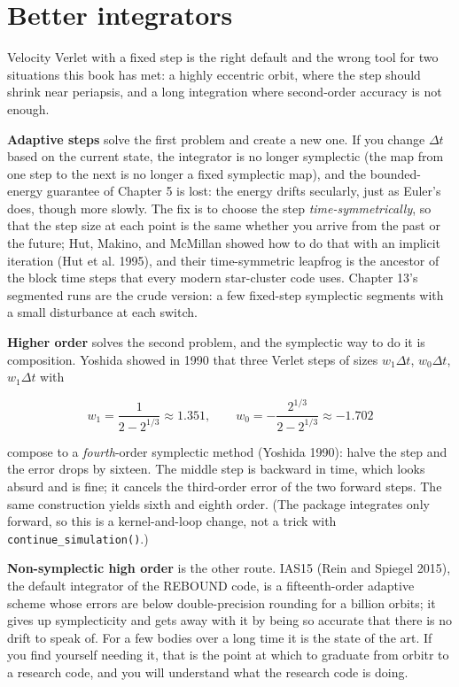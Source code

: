 \documentclass[
  10.5pt,
  letterpaper,
]{scrbook}
\theoremstyle{plain}
\theoremstyle{remark}
\begin{document}
\section{Better integrators}\label{better-integrators}

Velocity Verlet with a fixed step is the right default and the wrong
tool for two situations this book has met: a highly eccentric orbit,
where the step should shrink near periapsis, and a long integration
where second-order accuracy is not enough.

\textbf{Adaptive steps} solve the first problem and create a new one. If
you change \(\Delta t\) based on the current state, the integrator is no
longer symplectic (the map from one step to the next is no longer a
fixed symplectic map), and the bounded-energy guarantee of Chapter 5 is
lost: the energy drifts secularly, just as Euler's does, though more
slowly. The fix is to choose the step \emph{time-symmetrically}, so that
the step size at each point is the same whether you arrive from the past
or the future; Hut, Makino, and McMillan showed how to do that with an
implicit iteration (Hut et al. 1995), and their time-symmetric leapfrog
is the ancestor of the block time steps that every modern star-cluster
code uses. Chapter 13's segmented runs are the crude version: a few
fixed-step symplectic segments with a small disturbance at each switch.

\textbf{Higher order} solves the second problem, and the symplectic way
to do it is composition. Yoshida showed in 1990 that three Verlet steps
of sizes \(w_1\Delta t\), \(w_0\Delta t\), \(w_1\Delta t\) with

\[
w_1 = \frac{1}{2 - 2^{1/3}} \approx 1.351, \qquad w_0 = -\frac{2^{1/3}}{2 - 2^{1/3}} \approx -1.702
\]

compose to a \emph{fourth}-order symplectic method (Yoshida 1990): halve
the step and the error drops by sixteen. The middle step is backward in
time, which looks absurd and is fine; it cancels the third-order error
of the two forward steps. The same construction yields sixth and eighth
order. (The package integrates only forward, so this is a
kernel-and-loop change, not a trick with
\texttt{continue\_simulation()}.)

\textbf{Non-symplectic high order} is the other route. IAS15 (Rein and
Spiegel 2015), the default integrator of the REBOUND code, is a
fifteenth-order adaptive scheme whose errors are below double-precision
rounding for a billion orbits; it gives up symplecticity and gets away
with it by being so accurate that there is no drift to speak of. For a
few bodies over a long time it is the state of the art. If you find
yourself needing it, that is the point at which to graduate from orbitr
to a research code, and you will understand what the research code is
doing.
\end{document}

